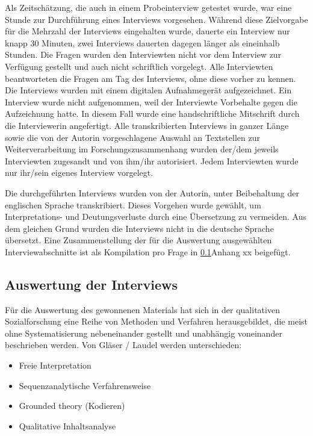 Als Zeitschätzung, die auch in einem Probeinterview getestet wurde, war eine Stunde zur Durchführung eines Interviews vorgesehen. Während diese Zielvorgabe für die Mehrzahl der Interviews eingehalten wurde, dauerte ein Interview nur knapp 30 Minuten, zwei Interviews dauerten dagegen länger als eineinhalb Stunden. Die Fragen wurden den Interviewten nicht vor dem Interview zur Verfügung gestellt und auch nicht schriftlich vorgelegt. Alle Interviewten beantworteten die Fragen am Tag des Interviews, ohne diese vorher zu kennen. Die Interviews wurden mit einem digitalen Aufnahmegerät aufgezeichnet. Ein Interview wurde nicht aufgenommen, weil der Interviewte Vorbehalte gegen die Aufzeichnung hatte. In diesem Fall wurde eine handschriftliche Mitschrift durch die Interviewerin angefertigt. Alle transkribierten Interviews in ganzer Länge sowie die von der Autorin vorgeschlagene Auswahl an Textstellen zur Weiterverarbeitung im Forschungszusammenhang wurden der/dem jeweils Interviewten zugesandt und von ihm/ihr autorisiert. Jedem Interviewten wurde nur ihr/sein eigenes Interview vorgelegt.\par
Die durchgeführten Interviews wurden von der Autorin, unter Beibehaltung der englischen Sprache transkribiert. Dieses Vorgehen wurde gewählt, um Interpretations- und Deutungsverluste durch eine Übersetzung zu vermeiden. Aus dem gleichen Grund wurden die Interviews nicht in die deutsche Sprache übersetzt. Eine Zusammenstellung der für die Auswertung ausgewählten Interviewabschnitte ist als Kompilation pro Frage in \ref{}Anhang xx beigefügt.

\subsection{Auswertung der Interviews}
Für die Auswertung des gewonnenen Materials hat sich in der qualitativen Sozialforschung eine Reihe von Methoden und Verfahren herausgebildet, die meist ohne Systematisierung nebeneinander gestellt und unabhängig voneinander beschrieben werden. Von Gläser / Laudel werden unterschieden:
\begin{itemize}
\item Freie Interpretation
\item Sequenzanalytische Verfahrensweise
\item Grounded theory (Kodieren)
\item Qualitative Inhaltsanalyse
\end{itemize}

